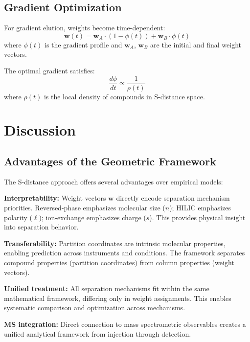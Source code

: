 \documentclass[twocolumn,10pt]{article}
\begin{document}
\subsection{Gradient Optimization}

For gradient elution, weights become time-dependent:
\begin{equation}
\mathbf{w}(t) = \mathbf{w}_A \cdot (1 - \phi(t)) + \mathbf{w}_B \cdot \phi(t)
\end{equation}
where $\phi(t)$ is the gradient profile and $\mathbf{w}_A$, $\mathbf{w}_B$ are the initial and final weight vectors.

The optimal gradient satisfies:
\begin{equation}
\frac{d\phi}{dt} \propto \frac{1}{\rho(t)}
\end{equation}
where $\rho(t)$ is the local density of compounds in S-distance space.

\section{Discussion}
\label{sec:discussion}

\subsection{Advantages of the Geometric Framework}

The S-distance approach offers several advantages over empirical models:

\textbf{Interpretability:} Weight vectors $\mathbf{w}$ directly encode separation mechanism priorities. Reversed-phase emphasizes molecular size ($n$); HILIC emphasizes polarity ($\ell$); ion-exchange emphasizes charge ($s$). This provides physical insight into separation behavior.

\textbf{Transferability:} Partition coordinates are intrinsic molecular properties, enabling prediction across instruments and conditions. The framework separates compound properties (partition coordinates) from column properties (weight vectors).

\textbf{Unified treatment:} All separation mechanisms fit within the same mathematical framework, differing only in weight assignments. This enables systematic comparison and optimization across mechanisms.

\textbf{MS integration:} Direct connection to mass spectrometric observables creates a unified analytical framework from injection through detection.
\end{document}
